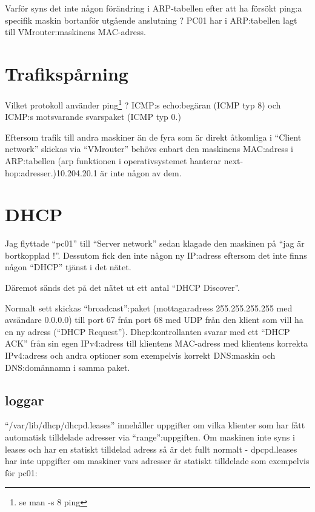 \documentclass[swedish,10pt,a4paper]{article}
\begin{document}
Varför syns det inte någon förändring i ARP-tabellen efter att
ha försökt ping:a specifik maskin bortanför utgående anslutning ?
PC01 har i ARP:tabellen lagt till VMrouter:maskinens MAC-adress.

\section{Trafikspårning}
\label{sec:wireshark_usage}

Vilket protokoll använder ping\footnote{se man -s 8 ping} ? ICMP:s echo:begäran (ICMP typ 8) och ICMP:s motsvarande svarspaket (ICMP typ 0.)

Eftersom trafik till andra maskiner än de fyra som är direkt åtkomliga i ``Client network'' skickas via
``VMrouter'' behövs enbart den maskinens MAC:adress i ARP:tabellen (arp funktionen i operativsystemet hanterar
next-hop:adresser.)\@10.204.20.1 är inte någon av dem.

\section{DHCP}
\label{sec:dhcp_konf}

Jag flyttade ``pc01'' till  ``Server network'' sedan klagade den maskinen på ``jag är bortkopplad !''.
Dessutom fick den inte någon ny IP:adress eftersom det inte finns någon ``DHCP'' tjänst i det nätet.

Däremot sänds det på det nätet ut ett antal ``DHCP Discover''.

Normalt sett skickas ``broadcast'':paket (mottagaradress 255.255.255.255 med avsändare 0.0.0.0) till port 67 från port 68 med UDP från
den klient som vill ha en ny adress (``DHCP Request''). Dhcp:kontrollanten svarar med ett ``DHCP ACK'' från sin
egen IPv4:adress till klientens MAC-adress med klientens korrekta IPv4:adress och andra optioner som exempelvis
korrekt DNS:maskin och DNS:domännamn i samma paket.

\subsection{loggar}

``/var/lib/dhcp/dhcpd.leases'' innehåller uppgifter om vilka klienter som har fått
automatisk tilldelade adresser via ``range'':uppgiften. Om maskinen inte syns i leases och
har en statiskt tilldelad adress så är det fullt normalt - dpcpd.leases har inte
uppgifter om maskiner vars adresser är statiskt tilldelade
som exempelvis för pc01:
\end{document}
